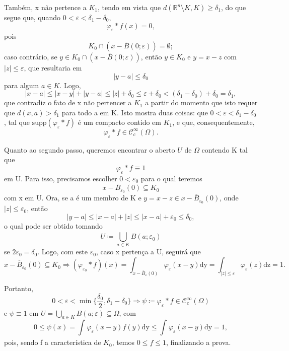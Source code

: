 \documentclass[../distribution_theory_notes.tex]{subfiles}
\begin{document}
\begin{proof*}
	Também, x não pertence a \(K_1\), tendo em vista que \(d(\mathbb{R}^{n}\setminus{K}, K)\geq \delta_1\), do que segue que, quando \(0<\varepsilon <\delta_1-\delta_0,\)
	\[
		\varphi_\varepsilon *f(x)=0,
	\]
	pois
	\[
		K_{0}\cap (x-\overline{B}(0; \varepsilon ))=\emptyset;
	\]
	caso contrário, se \(y\in K_{0}\cap (x-\overline{B}(0; \varepsilon ))\), então \(y\in K_{0}\) e \(y=x-z\) com \(|z|\leq \varepsilon \), que resultaria em
	\[
		|y-a|\leq \delta_{0}
	\]
	para algum \(a\in K\). Logo,
	\[
		|x-a|\leq |x-y|+|y-a|\leq |z|+\delta_{0}\leq \varepsilon +\delta_{0}<(\delta_1-\delta_0)+\delta_0=\delta_1,
	\]
	que contradiz o fato de x não pertencer a \(K_1\) a partir do momento que isto requer que \(d(x, a)>\delta_1\) para todo a em K. Isto mostra duas coisas: que \(0<\varepsilon <\delta_1-\delta_0\), tal que \(\mathrm{supp}(\varphi_\varepsilon *f)\) é um compacto contido em \(K_1\), e que, consequentemente,
	\[
		\varphi_\varepsilon *f\in \mathcal{C}_{c}^{\infty}(\Omega ).
	\]

	Quanto ao segundo passo, queremos encontrar o aberto \(U\) de \(\Omega \) contendo K tal que
	\[
		\varphi_\varepsilon *f\equiv 1
	\]
	em U. Para isso, precisamos escolher \(0<\varepsilon_0\) para o qual teremos
	\[
		x-\overline{B}_{\varepsilon_{0}}(0)\subseteq K_{0}
	\]
	com x em U. Ora, se a é um membro de K e \(y=x-z\in x-\overline{B}_{\varepsilon_{0} }(0)\), onde \(|z|\leq \varepsilon_{0}\), então
	\[
		|y-a|\leq |x-a|+|z|\leq |x-a|+\varepsilon_{0} \leq \delta_{0},
	\]
	o qual pode ser obtido tomando
	\[
		U\coloneqq \bigcup_{a\in K}^{}B(a; \varepsilon_{0})
	\]
	se \(2\varepsilon_{0}=\delta_{0}\). Logo, com este \(\varepsilon_{0}\), caso x pertença a U, seguirá que
	\[
		x-\overline{B}_{\varepsilon_{0}}(0)\subseteq K_{0}\Rightarrow (\varphi_{\varepsilon_{0}}*f)(x)=\int_{x-\overline{B}_{\varepsilon }(0)}^{}\varphi_{\varepsilon }(x-y) \mathrm{dy}=\int_{|z|\leq \varepsilon }^{}\varphi_{\varepsilon }(z) \mathrm{dz}=1.
	\]

	Portanto,
	\[
		0<\varepsilon <\min\limits_{}\biggl\{\frac{\delta_{0}}{2}, \delta_1-\delta_0\biggr\} \Rightarrow \psi \coloneqq \varphi_\varepsilon *f\in \mathcal{C}_{c}^{\infty}(\Omega )
	\]
	e \(\psi\equiv 1\) em \(U=\bigcup_{a\in K}^{}B(a; \varepsilon )\subseteq \Omega \), com
	\[
		0\leq \psi (x)=\int_{}^{}\varphi_\varepsilon (x-y)f(y) \mathrm{dy}\leq \int_{}^{}\varphi_\varepsilon (x-y) \mathrm{dy}=1,
	\]
	pois, sendo f a característica de \(K_{0}\), temos \(0\leq f\leq 1\), finalizando a prova. \qedsymbol

\end{proof*}
\end{document}
